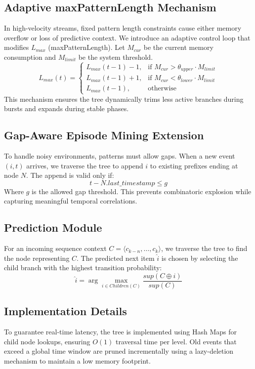 \documentclass[conference]{IEEEtran}
\begin{document}
\subsection{Adaptive maxPatternLength Mechanism}
In high-velocity streams, fixed pattern length constraints cause either memory overflow or loss of predictive context. We introduce an adaptive control loop that modifies $L_{max}$ (maxPatternLength). Let $M_{cur}$ be the current memory consumption and $M_{limit}$ be the system threshold. 
\begin{equation}
    L_{max}(t) = \begin{cases} 
      L_{max}(t-1) - 1, & \text{if } M_{cur} > \theta_{upper} \cdot M_{limit} \\
      L_{max}(t-1) + 1, & \text{if } M_{cur} < \theta_{lower} \cdot M_{limit} \\
      L_{max}(t-1), & \text{otherwise}
   \end{cases}
\end{equation}
This mechanism ensures the tree dynamically trims less active branches during bursts and expands during stable phases.

\subsection{Gap-Aware Episode Mining Extension}
To handle noisy environments, patterns must allow gaps. When a new event $(i, t)$ arrives, we traverse the tree to append $i$ to existing prefixes ending at node $N$. The append is valid only if:
\begin{equation}
    t - N.last\_timestamp \le g
\end{equation}
Where $g$ is the allowed gap threshold. This prevents combinatoric explosion while capturing meaningful temporal correlations.

\subsection{Prediction Module}
For an incoming sequence context $C = \langle c_{k-n}, \dots, c_k \rangle$, we traverse the tree to find the node representing $C$. The predicted next item $\hat{i}$ is chosen by selecting the child branch with the highest transition probability:
\begin{equation}
    \hat{i} = \arg\max_{i \in Children(C)} \frac{sup(C \oplus i)}{sup(C)}
\end{equation}

\subsection{Implementation Details}
To guarantee real-time latency, the tree is implemented using Hash Maps for child node lookups, ensuring $O(1)$ traversal time per level. Old events that exceed a global time window are pruned incrementally using a lazy-deletion mechanism to maintain a low memory footprint.
\end{document}

